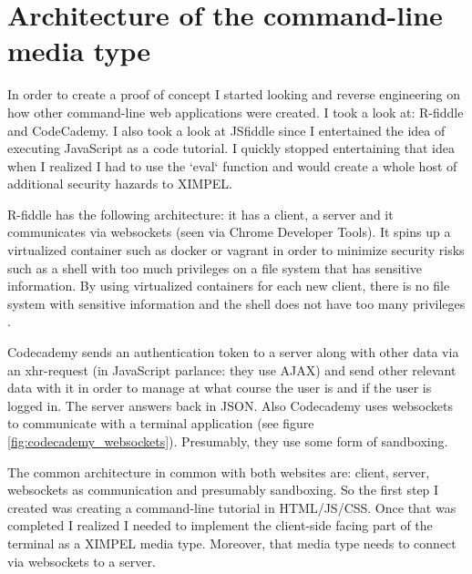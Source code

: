 \section{Architecture of the command-line media type}
In order to create a proof of concept I started looking and reverse engineering on how other command-line web applications were created. I took a look at: R-fiddle and CodeCademy. I also took a look at JSfiddle since I entertained the idea of executing JavaScript as a code tutorial. I quickly stopped entertaining that idea when I realized I had to use the `eval` function and would create a whole host of additional security hazards to XIMPEL. 

R-fiddle has the following architecture: it has a client, a server and it communicates via websockets (seen via Chrome Developer Tools). It spins up a virtualized container such as docker or vagrant in order to minimize security risks such as a shell with too much privileges on a file system that has sensitive information. By using virtualized containers for each new client, there is no file system with sensitive information and the shell does not have too many privileges \cite{r-fiddle}.

Codecademy sends an authentication token to a server along with other data via an xhr-request (in JavaScript parlance: they use AJAX) and send other relevant data with it in order to manage at what course the user is and if the user is logged in. The server answers back in JSON. Also Codecademy uses websockets to communicate with a terminal application (see figure \ref{fig:codecademy_websockets}). Presumably, they use some form of sandboxing.

The common architecture in common with both websites are: client, server, websockets as communication and presumably sandboxing. So the first step I created was creating a command-line tutorial in HTML/JS/CSS. Once that was completed I realized I needed to implement the client-side facing part of the terminal as a XIMPEL media type. Moreover, that media type needs to connect via websockets to a server. 

